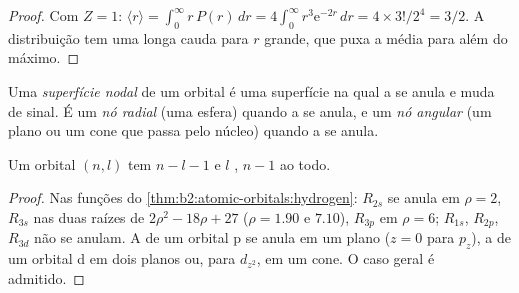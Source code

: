 \begin{proof}
Com $Z = 1$: $\langle r\rangle = \int_0^\infty r\,P(r)\,dr = 4\int_0^\infty r^3\mathrm e^{-2r}
\,dr = 4 \times 3!/2^4 = 3/2$. A distribuição tem uma longa cauda para $r$
grande, que puxa a média para além do máximo.
\end{proof}

\begin{definition}[Nós]\label{def:b2:atomic-orbitals:node}
Uma \emph{superfície nodal} de um orbital é uma superfície na
qual a  se anula e muda de sinal. É um \emph{nó radial}
(uma esfera) quando a  se anula, e um \emph{nó
angular} (um plano ou um cone que passa pelo núcleo) quando a
 se anula.
\end{definition}

\begin{proposition}\label{prop:b2:atomic-orbitals:nodes}
Um orbital $(n, l)$ tem $n - l - 1$  e $l$ , $n - 1$
ao todo.
\end{proposition}

\begin{proof}
Nas funções do \cref{thm:b2:atomic-orbitals:hydrogen}: $R_{2s}$ se anula em
$\rho = 2$, $R_{3s}$ nas duas raízes de $2\rho^2 - 18\rho + 27$ ($\rho = 1.90$ e $7.10$),
$R_{3p}$ em $\rho = 6$; $R_{1s}$, $R_{2p}$, $R_{3d}$ não se anulam. A 
de um orbital p se anula em um plano ($z = 0$ para $p_z$), a de um orbital d em
dois planos ou, para $d_{z^2}$, em um cone. O caso geral é admitido.
\end{proof}

